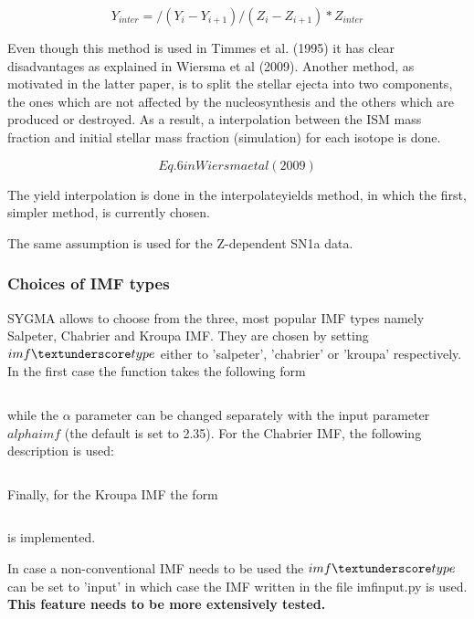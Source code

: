 \begin{equation}
Y_{inter} = /(Y_i-Y_{i+1})/(Z_i-Z_{i+1}) * Z_{inter}
\end{equation}


Even though this method is used in Timmes et al. (1995)
it has clear disadvantages as explained in Wiersma et al (2009).
Another method, as motivated in the latter paper, is to split
the stellar ejecta into two components, the ones which are not
affected by the nucleosynthesis and the others which are 
produced or destroyed. As a result, a interpolation between
the ISM mass fraction and initial stellar mass fraction 
(simulation) for each isotope is done.

\begin{equation}
Eq. 6 in Wiersma et al (2009)
\end{equation}


The yield interpolation is done in the interpolate\textunderscore yields method,
in which the first, simpler method, is currently chosen.


The same assumption is used for the Z-dependent SN1a data.

\subsubsection{Choices of IMF types}

SYGMA allows to choose from the three, most popular IMF types
namely Salpeter, Chabrier and Kroupa IMF. They are chosen by
setting $imf\textunderscore type$ either to 'salpeter', 'chabrier'
or 'kroupa' respectively. In the first case the function takes
the following form

\begin{equation}
\end{equation}

while the $\alpha$ parameter can be changed separately with
the input parameter $alphaimf$ (the default is set to 2.35).
For the Chabrier IMF, the following description is used:

\begin{equation}
%
\end{equation}

Finally, for the Kroupa IMF the form 

\begin{equation}
%
\end{equation}

is implemented.

In case a non-conventional IMF needs to be used the 
$imf\textunderscore type$ can be set to 'input' in
which case the IMF written in the file imf\textunderscore input.py is used.
\textbf{This feature needs to be more extensively tested.}



